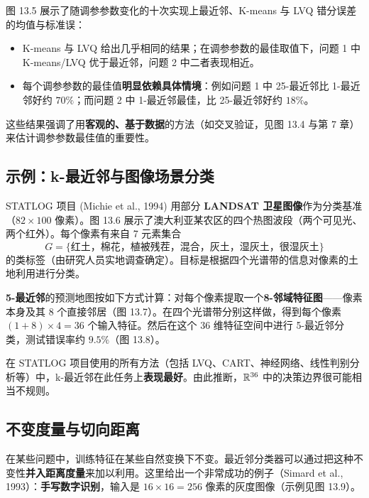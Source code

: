 图 13.5 展示了随调参参数变化的十次实现上最近邻、K-means 与 LVQ 错分误差的均值与标准误：

\begin{itemize}[itemsep=1pt]
\item K-means 与 LVQ 给出几乎相同的结果；在调参参数的最佳取值下，问题 1 中 K-means/LVQ 优于最近邻，问题 2 中二者表现相近。
\item 每个调参参数的最佳值\textbf{明显依赖具体情境}：例如问题 1 中 25-最近邻比 1-最近邻好约 $70\%$；而问题 2 中 1-最近邻最佳，比 25-最近邻好约 $18\%$。
\end{itemize}

这些结果强调了用\textbf{客观的、基于数据}的方法（如交叉验证，见图 13.4 与第 7 章）来估计调参参数最佳值的重要性。

\subsection{示例：k-最近邻与图像场景分类}

STATLOG 项目 (Michie et al., 1994) 用部分 \textbf{LANDSAT 卫星图像}作为分类基准（$82\times100$ 像素）。图 13.6 展示了澳大利亚某农区的四个热图波段（两个可见光、两个红外）。每个像素有来自 7 元素集合
\[
G = \{\text{红土，棉花，植被残茬，混合，灰土，湿灰土，很湿灰土}\}
\]
的类标签（由研究人员实地调查确定）。目标是根据四个光谱带的信息对像素的土地利用进行分类。

\textbf{5-最近邻}的预测地图按如下方式计算：对每个像素提取一个\textbf{8-邻域特征图}——像素本身及其 8 个直接邻居（图 13.7）。在四个光谱带分别这样做，得到每个像素 $(1+8)\times 4 = 36$ 个输入特征。然后在这个 36 维特征空间中进行 5-最近邻分类，测试错误率约 $\mathbf{9.5\%}$（图 13.8）。

\begin{remark}[STATLOG 结论]
在 STATLOG 项目使用的所有方法（包括 LVQ、CART、神经网络、线性判别分析等）中，k-最近邻在此任务上\textbf{表现最好}。由此推断，$\mathbb{R}^{36}$ 中的决策边界很可能相当不规则。
\end{remark}

\subsection{不变度量与切向距离}

在某些问题中，训练特征在某些自然变换下不变。最近邻分类器可以通过把这种不变性\textbf{并入距离度量}来加以利用。这里给出一个非常成功的例子（Simard et al., 1993）：\textbf{手写数字识别}，输入是 $16\times16=256$ 像素的灰度图像（示例见图 13.9）。

